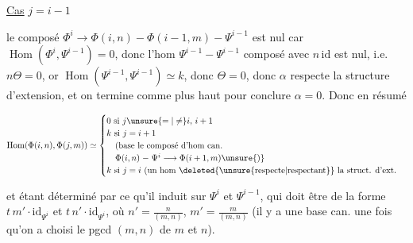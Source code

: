 
\uline{Cas} $j=i-1$


le composé $\Phi^i\longrightarrow\Phi(i,n)\mathrel{-}\Phi(i-1,m)\mathrel{-}\Psi^{i-1}$ est nul car $\operatorname{Hom}(\Phi^i,\Psi^{i-1})=0$, donc l'hom   $\Psi^{i-1}\mathrel{-}\Psi^{i-1}$ composé avec $n\,\mathrm{id}$ est nul, i.e. $n\Theta=0$, or $\operatorname{Hom}(\Psi^{i-1},\Psi^{i-1})\simeq k$, donc $\Theta=0$, donc $\alpha$ respecte la structure d'extension, et on termine comme plus haut pour conclure $\alpha=0$. Donc en résumé

\[
\operatorname{Hom}(\Phi(i,n),\Phi(j,m))\simeq
\begin{cases}
0\ \text{si } j\unsure{=|\ne}i,\,i+1\\
k\ \text{si }j=i+1\\
\quad(\text{base le composé d'hom can.}\\
\quad\Phi(i,n)\mathrel{-}\Psi^i\longrightarrow\Phi(i+1,m)\unsure{)}\\
k\ \text{si }j=i\ (\text{un hom }\deleted{\text{\unsure{respecte|respectant}}}\ \text{la struct. d'ext.}
\end{cases}
\]

et étant déterminé par ce qu'il induit sur $\Psi^i$ et $\Psi^{i-1}$, qui doit être de la forme $t\,m'\cdot\mathrm{id}_{\Psi^i}$ et $t\,n'\cdot\mathrm{id}_{\Psi^{i}}$, où $n'=\frac n{(m,n)}$, $m'=\frac m{(m,n)}$ (il y a une base can. une fois qu'on a choisi le pgcd $(m,n)$ de $m$ et $n$).

